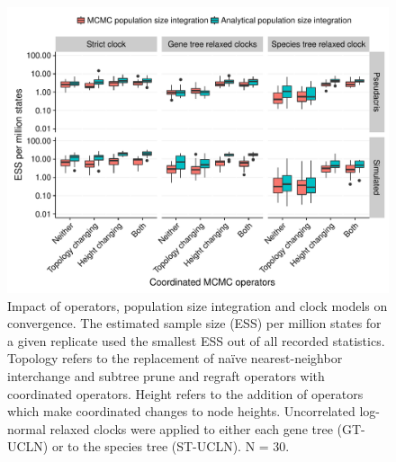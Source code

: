 \documentclass[12pt]{article}
\begin{document}
\begin{figure}[htb!]
\centering
\includegraphics[width=\textwidth]{minimum_ess_per_mstates_starbeast2.pdf}
\caption
{Impact of operators, population size integration and clock models on
convergence. The estimated sample size (ESS) per million states for a given replicate
used the smallest ESS out of all recorded statistics. Topology refers to the
replacement of na\"ive nearest-neighbor interchange and subtree prune and
regraft operators with coordinated operators. Height refers to the addition of
operators which make coordinated changes to node heights. Uncorrelated log-
normal relaxed clocks were applied to either each gene tree (GT-UCLN) or to
the species tree (ST-UCLN). N = 30.}
\label{fig:realEssPerMstates}
\end{figure}

\clearpage
\end{document}
